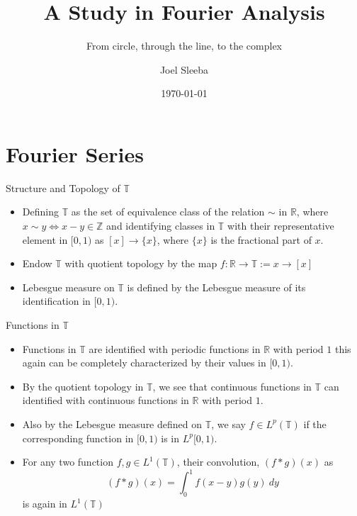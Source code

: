 \documentclass[compress]{beamer}
\title{A Study in Fourier Analysis}
\subtitle{From circle, through the line, to the complex}
\author{Joel Sleeba}
\institute{IISER Thiruvananthapuram}
\date{\today}
\newcommand{\R}{\mathbb R}
\newcommand{\T}{\mathbb T}
\begin{document}
\begin{frame}
  \maketitle
\end{frame}


\section{Fourier Series}

\begin{frame}{Structure and Topology of $\mathbb{T}$}{}
  \begin{itemize}
    \item Defining $\mathbb{T}$ as the set of equivalence class of the relation $\sim$ in $\R$, where $x\sim y \iff x-y \in \mathbb{Z}$ and identifying classes in $\mathbb{T}$ with their representative element in $[0,1)$ as $[x] \to \{x\}$, where $\{x\}$ is the fractional part of $x$.
    \item Endow $\mathbb{T}$ with quotient topology by the map $f: \mathbb{R} \to \mathbb{T}:= x \to [x]$
    \item Lebesgue measure on $\mathbb{T}$ is defined by the Lebesgue measure of its identification in $[0,1)$.
  \end{itemize}
\end{frame}

\begin{frame}{Functions in $\T$}
  \begin{itemize}
    \item Functions in $\T$ are identified with periodic functions in $\R$ with period $1$ this again can be completely characterized by their values in $[0,1)$.
    \item By the quotient topology in $\T$, we see that continuous functions in $\T$ can identified with continuous functions in $\R$ with period $1$.
    \item Also by the Lebesgue measure defined on $\T$, we say $f \in L^p(\T)$ if the corresponding function in $[0, 1)$ is in $L^p[0, 1)$.
    \item For any two function $f, g \in L^1(\T)$, their convolution, $(f*g)(x)$ as $$(f*g)(x) = \int_0^1 f(x-y)g(y) \ dy$$
      is again in $L^1(\T)$
  \end{itemize}
\end{frame}
\end{document}
